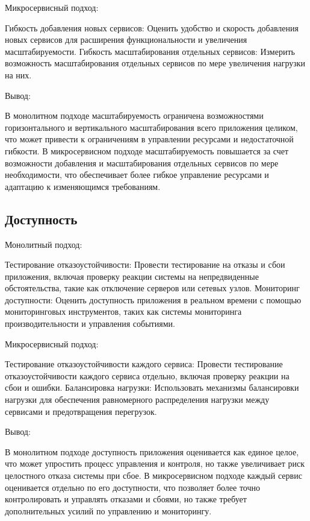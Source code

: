Микросервисный подход:

    Гибкость добавления новых сервисов: Оценить удобство и скорость добавления новых сервисов для расширения функциональности и увеличения масштабируемости.
    Гибкость масштабирования отдельных сервисов: Измерить возможность масштабирования отдельных сервисов по мере увеличения нагрузки на них.

Вывод:

    В монолитном подходе масштабируемость ограничена возможностями горизонтального и вертикального масштабирования всего приложения целиком, что может привести к ограничениям в управлении ресурсами и недостаточной гибкости.
    В микросервисном подходе масштабируемость повышается за счет возможности добавления и масштабирования отдельных сервисов по мере необходимости, что обеспечивает более гибкое управление ресурсами и адаптацию к изменяющимся требованиям.

\subsection{Доступность}

Монолитный подход:

    Тестирование отказоустойчивости: Провести тестирование на отказы и сбои приложения, включая проверку реакции системы на непредвиденные обстоятельства, такие как отключение серверов или сетевых узлов.
    Мониторинг доступности: Оценить доступность приложения в реальном времени с помощью мониторинговых инструментов, таких как системы мониторинга производительности и управления событиями.

Микросервисный подход:

    Тестирование отказоустойчивости каждого сервиса: Провести тестирование отказоустойчивости каждого сервиса отдельно, включая проверку реакции на сбои и ошибки.
    Балансировка нагрузки: Использовать механизмы балансировки нагрузки для обеспечения равномерного распределения нагрузки между сервисами и предотвращения перегрузок.

Вывод:

    В монолитном подходе доступность приложения оценивается как единое целое, что может упростить процесс управления и контроля, но также увеличивает риск целостного отказа системы при сбое.
    В микросервисном подходе каждый сервис оценивается отдельно по его доступности, что позволяет более точно контролировать и управлять отказами и сбоями, но также требует дополнительных усилий по управлению и мониторингу.

